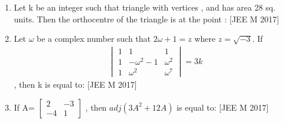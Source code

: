 \documentclass[journal,,12pt,twocolumn]{IEEEtran}
\theoremstyle{remark}
\begin{document}
\begin{enumerate}
    \item Let k be an integer such that triangle with vertices ,  and  has area 28 sq. units. Then the orthocentre of the triangle is at the point :
    \hfill{[JEE M 2017]}
    \begin{enumerate}
    \end{enumerate}
    \item Let $\omega$ be a complex number such that $2\omega + 1=z$ where $z=\sqrt{-3}$. If \begin{align*}\begin{vmatrix}
1 & 1  & 1 \\
1 & -\omega^2-1 & \omega^2 \\
1 & \omega^2 & \omega^7 
\end{vmatrix}=3k \end{align*}, then k is equal to:
\hfill{[JEE M 2017]}
\begin{enumerate}
\end{enumerate}
\item If A= $\begin{bmatrix}
    2 & -3 \\
    -4 & 1
\end{bmatrix}$
    , then $adj(3A^2+12A)$ is equal to:
\hfill{[JEE M 2017]}
\begin{enumerate}
\end{enumerate}
\end{enumerate}
\end{document}

